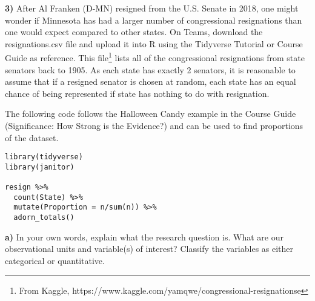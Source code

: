 \documentclass{article}
\newif\ifPrintSolution
\newcommand{\sol}[1]{\ifPrintSolution {\color{blue} #1 } \fi}
\begin{document}
\sol{The strength of evidence would decrease if we go from a one-sided to a two-sided test.\\ 
Of note, our p-value will roughly double (higher p-value is less strength of evidence), but our z-statistic is  still the same.}

\pagebreak

\textbf{3) } After Al Franken (D-MN) resigned from the U.S. Senate in 2018, one might wonder if Minnesota has had a larger number of congressional resignations than one would expect compared to other states. On Teams, download the \color{blue} resignations.csv \color{black}  file and upload it into R using the Tidyverse Tutorial or Course Guide as reference. This file\footnote{From Kaggle, https://www.kaggle.com/yamqwe/congressional-resignationse} lists all of the congressional resignations from state senators back to 1905. As each state has exactly 2 senators, it is reasonable to assume that if a resigned senator is chosen at random, each state has an equal chance of being represented if state has nothing to do with resignation.

The following code follows the Halloween Candy example in the Course Guide (Significance: How Strong is the Evidence?) and can be used to find proportions of the dataset.

\color{blue}
\begin{verbatim}
library(tidyverse)
library(janitor)

resign %>% 
  count(State) %>% 
  mutate(Proportion = n/sum(n)) %>% 
  adorn_totals()
\end{verbatim}
\color{black}


\sol{Alternatively,\\ 

\color{blue}resign $\% > \%$ \\
\hspace{0.1in} mutate(MN = State == ``MN") $\%>\%$ \\
 \hspace{0.1in}  count(MN) $\% > \%$\\ 
 \hspace{0.1in}  mutate(Proportion = n/sum(n)) $\%>\%$ \\
 \hspace{0.1in}  adorn$\_$totals()
  \color{black}
 }
 
 \hspace{0.1in} \textbf{a) } In your own words, explain what the research question is. What are our observational units and variable(s) of interest? Classify the variables as either categorical or quantitative.
 
\end{document}
